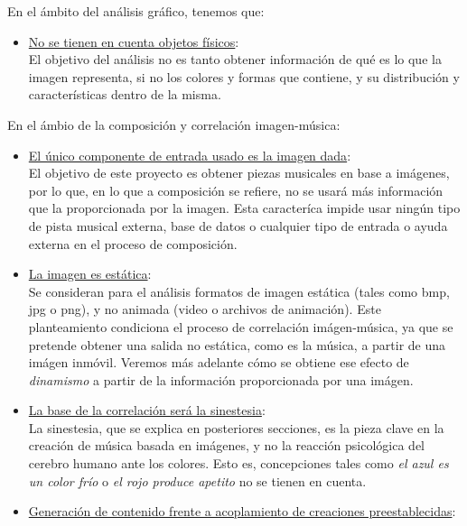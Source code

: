 		
		En el ámbito del análisis gráfico, tenemos que:
		\begin{itemize}
		
		\item \underline{No se tienen en cuenta objetos físicos}:\\
			El objetivo del análisis no es tanto obtener información de qué es lo que la imagen representa, si no los colores y formas que contiene, y su distribución y características dentro de la misma.
		\end{itemize}
		
		En el ámbio de la composición y correlación imagen-música:
		
		\begin{itemize}
		
		\item \underline{El único componente de entrada usado es la imagen dada}:\\
			El objetivo de este proyecto es obtener piezas musicales en base a imágenes, por lo que, en lo que a composición se refiere, no se usará más información que la proporcionada por la imagen. Esta caracteríca impide usar ningún tipo de pista musical externa, base de datos o cualquier tipo de entrada o ayuda externa en el proceso de composición.
		\item \underline{La imagen es estática}:\\
			Se consideran para el análisis formatos de imagen estática (tales como bmp, jpg o png), y no animada (video o archivos de animación). Este planteamiento condiciona el proceso de correlación imágen-música, ya que se pretende obtener una salida no estática, como es la música, a partir de una imágen inmóvil. Veremos más adelante cómo se obtiene ese efecto de \emph{dinamismo} a partir de la información proporcionada por una imágen.
		\item \underline{La base de la correlación será la sinestesia}:\\	
			La sinestesia, que se explica en posteriores secciones, es la pieza clave en la creación de música basada en imágenes, y no la reacción psicológica del cerebro humano ante los colores. Esto es, concepciones tales como \emph{el azul es un color frío} o \emph{el rojo produce apetito} no se tienen en cuenta.\\
		\item \underline{Generación de contenido frente a acoplamiento de creaciones preestablecidas}:\\				

\end{itemize}
